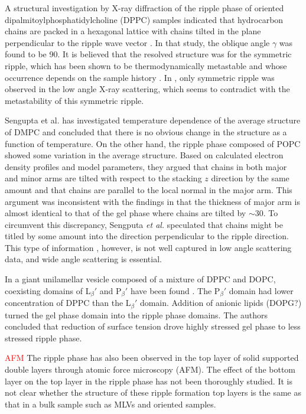 A structural investigation by X-ray diffraction of the ripple phase of
oriented dipalmitoylphosphatidylcholine (DPPC) samples indicated that
hydrocarbon chains are packed in a hexagonal lattice with chains
tilted in the plane perpendicular to the ripple wave vector \cite{ref:Hentschel91}.
In that study, the oblique angle $\gamma$ was found to be 90\textdegree.
It is believed that the resolved structure was for the symmetric ripple,
which has been shown to be thermodynamically metastable and whose occurrence
depends on the sample history \cite{ref:Katsaras00}. 
In \cite{ref:Hentschel91}, only symmetric ripple was observed in the low angle
X-ray scattering, which seems to contradict with the metastability of this 
symmetric ripple.

Sengupta et al. \cite{ref:Sengupta03} has investigated temperature dependence of the average structure
of DMPC and concluded that there is no obvious change in the structure
as a function of temperature. On the other hand, the ripple phase composed of 
POPC showed some variation in the average structure.
Based on calculated electron density profiles and model parameters, they
argued that chains in both major and minor arms are tilted with respect to 
the stacking $z$ direction by the same amount and that 
chains are parallel to the local normal in the major arm. This argument 
was inconsistent with the findings in \cite{ref:Sun96} that
the thickness of major arm is almost identical to that of the gel phase where chains 
are tilted by $\sim$30\textdegree. To circumvent this discrepancy, 
Sengputa \textit{et al.} speculated that chains might be titled by some amount into the 
direction perpendicular to the ripple direction. This type of information
, however, is not well captured in low angle scattering data, and
wide angle scattering is essential.

In a giant unilamellar vesicle composed of a mixture of DPPC and DOPC, 
coexisting domains of L$_\beta'$ and P$_\beta'$ have been found \cite{ref:Li06}.
The P$_\beta'$ domain had lower concentration of DPPC than the L$_\beta'$
domain. Addition of anionic lipids (DOPG?) turned the gel phase domain
into the ripple phase domains. The authors concluded that reduction of 
surface tension drove highly stressed gel phase to less stressed ripple phase.

\textcolor{red}{AFM}
The ripple phase has also been observed in the top layer of 
solid supported double layers through atomic force microscopy (AFM).
The effect of the bottom layer on the top layer in the ripple phase has not been
thoroughly studied. 
It is not clear whether the structure of these ripple formation top layers
is the same as that in a bulk sample such as MLVs and oriented samples.

